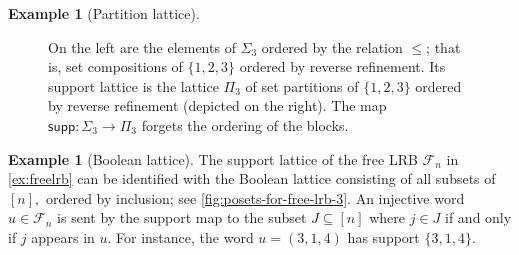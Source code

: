 \documentclass[11pt, oneside, reqno]{amsart}
\theoremstyle{definition}
\newtheorem{example}[theorem]{Example}
\numberwithin{equation}{section}
\def \supp{\mathsf{supp}}
\begin{document}
\begin{example}[Partition lattice]
\begin{figure}[htpb]
        \caption{On the left are the elements of $\Sigma_3$ ordered by the
            relation $\leq$; that is, set compositions of $\{1,2,3\}$ ordered by
            reverse refinement. Its support lattice is the lattice $\Pi_3$ of
            set partitions of $\{1,2,3\}$ ordered by reverse refinement (depicted on
            the right).
            The map $\supp: \Sigma_3 \xrightarrow{} \Pi_3$ forgets the ordering
            of the blocks.}
        \label{fig:posets-of-set-compositions-and-set-partitions}
    \end{figure}
\end{example}

\begin{example}[Boolean lattice]\label{ex:booleanlattice} \rm
    The support lattice of the free LRB $\mathscr{F}_n$ in \cref{ex:freelrb}
    can be identified with the Boolean lattice consisting of
    all subsets of $[n],$ ordered by inclusion;
    see \cref{fig:posets-for-free-lrb-3}. An
    injective word $u \in \mathscr{F}_n$ is sent by the support map to the
    subset $J \subseteq [n]$ where $j \in J$ if and only if $j$ appears in $u$.
    For instance, the word $u = (3,1,4)$ has support $\{ 3,1,4 \}$.
    \begin{figure}[ht]
        \centering
\end{figure}
\end{example}
\end{document}
